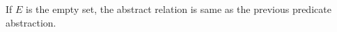 If $E$ is the empty set, the abstract
relation is same as the previous predicate abstraction.



%
%
%
%
%
%
%
%
%
%
%
%
%
%

